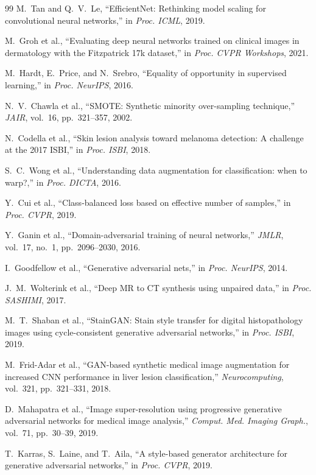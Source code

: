 \documentclass[10pt, twocolumn, letterpaper]{article}
\begin{document}
\begin{thebibliography}{99}
 M.~Tan and Q.~V.~Le, ``EfficientNet: Rethinking model scaling for convolutional neural networks,'' in \textit{Proc. ICML}, 2019.

 M.~Groh et al., ``Evaluating deep neural networks trained on clinical images in dermatology with the Fitzpatrick 17k dataset,'' in \textit{Proc. CVPR Workshops}, 2021.

 M.~Hardt, E.~Price, and N.~Srebro, ``Equality of opportunity in supervised learning,'' in \textit{Proc. NeurIPS}, 2016.

 N.~V.~Chawla et al., ``SMOTE: Synthetic minority over-sampling technique,'' \textit{JAIR}, vol.~16, pp.~321--357, 2002.

 N.~Codella et al., ``Skin lesion analysis toward melanoma detection: A challenge at the 2017 ISBI,'' in \textit{Proc. ISBI}, 2018.

 S.~C.~Wong et al., ``Understanding data augmentation for classification: when to warp?,'' in \textit{Proc. DICTA}, 2016.

 Y.~Cui et al., ``Class-balanced loss based on effective number of samples,'' in \textit{Proc. CVPR}, 2019.

 Y.~Ganin et al., ``Domain-adversarial training of neural networks,'' \textit{JMLR}, vol.~17, no.~1, pp.~2096--2030, 2016.

 I.~Goodfellow et al., ``Generative adversarial nets,'' in \textit{Proc. NeurIPS}, 2014.

 J.~M.~Wolterink et al., ``Deep MR to CT synthesis using unpaired data,'' in \textit{Proc. SASHIMI}, 2017.

 M.~T.~Shaban et al., ``StainGAN: Stain style transfer for digital histopathology images using cycle-consistent generative adversarial networks,'' in \textit{Proc. ISBI}, 2019.

 M.~Frid-Adar et al., ``GAN-based synthetic medical image augmentation for increased CNN performance in liver lesion classification,'' \textit{Neurocomputing}, vol.~321, pp.~321--331, 2018.

 D.~Mahapatra et al., ``Image super-resolution using progressive generative adversarial networks for medical image analysis,'' \textit{Comput. Med. Imaging Graph.}, vol.~71, pp.~30--39, 2019.

 T.~Karras, S.~Laine, and T.~Aila, ``A style-based generator architecture for generative adversarial networks,'' in \textit{Proc. CVPR}, 2019.


\end{thebibliography}
\end{document}
